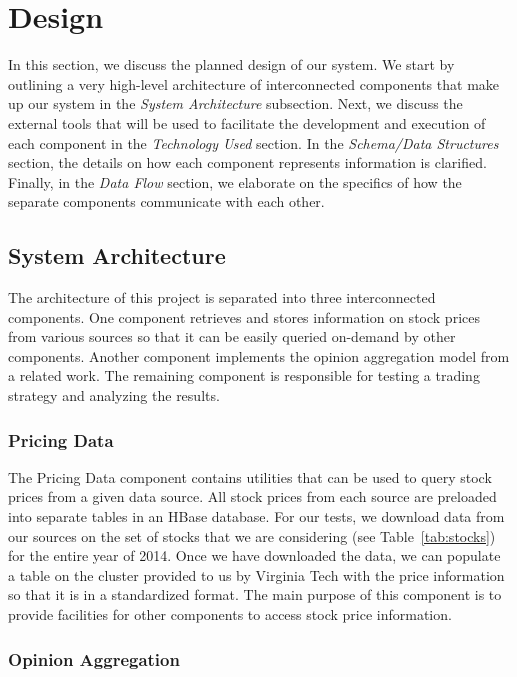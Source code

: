 
\section{Design}\label{design}

In this section, we discuss the planned design of our system.
We start by outlining a very high-level architecture of interconnected components that make up our system in the \textit{System Architecture} subsection.
Next, we discuss the external tools that will be used to facilitate the development and execution of each component in the \textit{Technology Used} section.
In the \textit{Schema/Data Structures} section, the details on how each component represents information is clarified.
Finally, in the \textit{Data Flow} section, we elaborate on the specifics of how the separate components communicate with each other.

\subsection{System Architecture}

The architecture of this project is separated into three interconnected components.
One component retrieves and stores information on stock prices from various sources so that it can be easily queried on-demand by other components.
Another component implements the opinion aggregation model from a related work.
The remaining component is responsible for testing a trading strategy and analyzing the results.

\subsubsection{Pricing Data}

The Pricing Data component contains utilities that can be used to query stock prices from a given data source.
All stock prices from each source are preloaded into separate tables in an HBase \cite{hbase} database.
For our tests, we download data from our sources on the set of stocks that we are considering (see Table~\ref{tab:stocks}) for the entire year of 2014.
Once we have downloaded the data, we can populate a table on the cluster provided to us by Virginia Tech with the price information so that it is in a standardized format.
The main purpose of this component is to provide facilities for other components to access stock price information.

\subsubsection{Opinion Aggregation}

